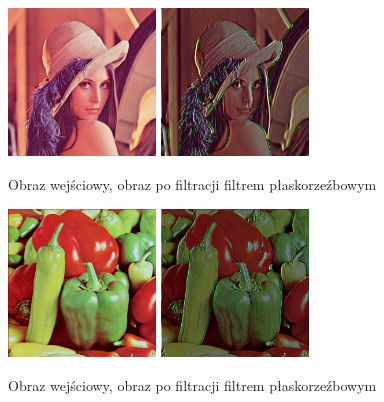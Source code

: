 \documentclass[final,a4paper,openany,12pt]{mwbk}
\begin{document}
\begin{figure}[H]
	\begin{center}
		\includegraphics[width=0.35\textwidth]{lena_color}
		\includegraphics[width=0.35\textwidth]{lena_color_reliefPrewitt_result}
	\end{center}
	\caption{Obraz wejściowy, obraz po filtracji filtrem płaskorzeźbowym}
\end{figure}

\begin{figure}[H]
	\begin{center}
		\includegraphics[width=0.35\textwidth]{peppers_color}
		\includegraphics[width=0.35\textwidth]{peppers_color_reliefPrewitt_result}
	\end{center}
	\caption{Obraz wejściowy, obraz po filtracji filtrem płaskorzeźbowym}
\end{figure}
\newpage
\end{document}
